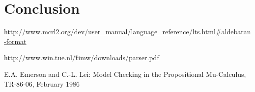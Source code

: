\documentclass[10pt,a4paper]{article}
\begin{document}
\section{Conclusion}\label{conc}

\begin{comment}
A picture of the labelled transition system.

\begin{tikzpicture}[->,>=stealth', shorten >=1pt,auto, node distance=2.8cm, semithick]
  \tikzstyle{every state}=[text=black]

  \node[initial,state] (0)                    {$0$};
  \node[state]         (1) [right of=0] {$1$};
  \node[state]         (2) [below of=0] {$2$};
  \node[state]         (3) [right of=1] {$3$};
  \node[state]         (4) [below of=1] {$4$};
  \node[state]         (5) [below of=2] {$5$};
  \node[state]         (6) [right of=4] {$6$};
  \node[state]         (7) [below of=4] {$7$};
  
 \path (0) edge node {$\tau$} (1)
 	   (0) edge node {$\tau$} (2)
 	   (1) edge node {$\tau$} (3)
 	   (1) edge node {$\tau$} (4)
 	   (2) edge node {$\tau$} (5)
 	   (2) edge node {$\tau$} (4)
 	   (3) edge node {$a$} 	  (6)
 	   (3) edge [bend right] node {$b$} 	  (0)
 	   (4) edge node {$\tau$} (6)
 	   (4) edge node {$\tau$} (7)
 	   (5) edge [bend left] node {$a$}    (0)
 	   (5) edge node {$a$}    (7)
 	   (6) edge [bend right] node {$\tau$} (2)
 	   (7) edge [bend right] node {$b$}    (1);
\end{tikzpicture}
\end{comment}

\begin{thebibliography}{9}
	 \url{http://www.mcrl2.org/dev/user_manual/language_reference/lts.html#aldebaran-format}
	
	 http://www.win.tue.nl/\~timw/downloads/parser.pdf
	
	 E.A. Emerson and C.-L. Lei: Model Checking in the Propositional Mu-Calculus, TR-86-06, February 1986
\end{thebibliography}
\end{document}
